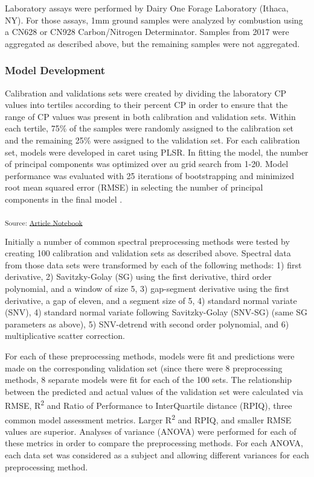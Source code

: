 \documentclass[
]{agujournal2019}
\begin{document}
Laboratory assays were performed by Dairy One Forage Laboratory (Ithaca,
NY). For those assays, 1mm ground samples were analyzed by combustion
using a CN628 or CN928 Carbon/Nitrogen Determinator. Samples from 2017
were aggregated as described above, but the remaining samples were not
aggregated.

\subsubsection{Model Development}\label{model-development}

Calibration and validations sets were created by dividing the laboratory
CP values into tertiles according to their percent CP in order to ensure
that the range of CP values was present in both calibration and
validation sets. Within each tertile, 75\% of the samples were randomly
assigned to the calibration set and the remaining 25\% were assigned to
the validation set. For each calibration set, models were developed in
caret using PLSR. In fitting the model, the number of principal
components was optimized over au grid search from 1-20. Model
performance was evaluated with 25 iterations of bootstrapping and
minimized root mean squared error (RMSE) in selecting the number of
principal components in the final model .

\textsubscript{Source:
\href{https://rvcrawford.github.io/glowing-system/index-preview.html}{Article
Notebook}}

Initially a number of common spectral preprocessing methods were tested
by creating 100 calibration and validation sets as described above.
Spectral data from those data sets were transformed by each of the
following methods: 1) first derivative, 2) Savitzky-Golay (SG) using the
first derivative, third order polynomial, and a window of size 5, 3)
gap-segment derivative using the first derivative, a gap of eleven, and
a segment size of 5, 4) standard normal variate (SNV), 4) standard
normal variate following Savitzky-Golay (SNV-SG) (same SG parameters as
above), 5) SNV-detrend with second order polynomial, and 6)
multiplicative scatter correction.

For each of these preprocessing methods, models were fit and predictions
were made on the corresponding validation set (since there were 8
preprocessing methods, 8 separate models were fit for each of the 100
sets. The relationship between the predicted and actual values of the
validation set were calculated via RMSE, R\textsuperscript{2} and Ratio
of Performance to InterQuartile distance (RPIQ), three common model
assessment metrics. Larger R\textsuperscript{2} and RPIQ, and smaller
RMSE values are superior. Analyses of variance (ANOVA) were performed
for each of these metrics in order to compare the preprocessing methods.
For each ANOVA, each data set was considered as a subject and allowing
different variances for each preprocessing method.
\end{document}
